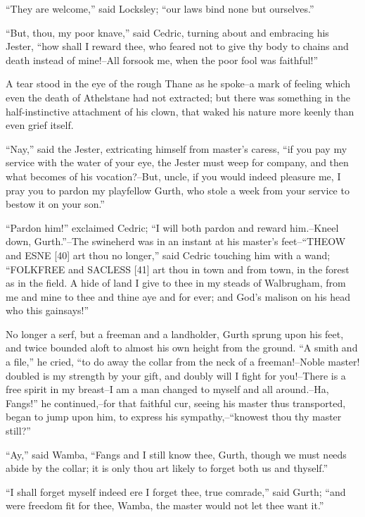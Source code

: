 ``They are welcome,'' said Locksley; ``our laws bind none but
ourselves.''

``But, thou, my poor knave,'' said Cedric, turning about and embracing
his Jester, ``how shall I reward thee, who feared not to give thy body
to chains and death instead of mine!--All forsook me, when the poor fool
was faithful!''

A tear stood in the eye of the rough Thane as he spoke--a mark of
feeling which even the death of Athelstane had not extracted; but there
was something in the half-instinctive attachment of his clown, that
waked his nature more keenly than even grief itself.

``Nay,'' said the Jester, extricating himself from master's caress, ``if
you pay my service with the water of your eye, the Jester must weep for
company, and then what becomes of his vocation?--But, uncle, if you
would indeed pleasure me, I pray you to pardon my playfellow Gurth, who
stole a week from your service to bestow it on your son.''

``Pardon him!'' exclaimed Cedric; ``I will both pardon and reward
him.--Kneel down, Gurth.''--The swineherd was in an instant at his
master's feet--``THEOW and ESNE {[}40{]} art thou no longer,'' said
Cedric touching him with a wand; ``FOLKFREE and SACLESS {[}41{]} art
thou in town and from town, in the forest as in the field. A hide of
land I give to thee in my steads of Walbrugham, from me and mine to thee
and thine aye and for ever; and God's malison on his head who this
gainsays!''

No longer a serf, but a freeman and a landholder, Gurth sprung upon his
feet, and twice bounded aloft to almost his own height from the ground.
``A smith and a file,'' he cried, ``to do away the collar from the neck
of a freeman!--Noble master! doubled is my strength by your gift, and
doubly will I fight for you!--There is a free spirit in my breast--I am
a man changed to myself and all around.--Ha, Fangs!'' he continued,--for
that faithful cur, seeing his master thus transported, began to jump
upon him, to express his sympathy,--``knowest thou thy master still?''

``Ay,'' said Wamba, ``Fangs and I still know thee, Gurth, though we must
needs abide by the collar; it is only thou art likely to forget both us
and thyself.''

``I shall forget myself indeed ere I forget thee, true comrade,'' said
Gurth; ``and were freedom fit for thee, Wamba, the master would not let
thee want it.''

